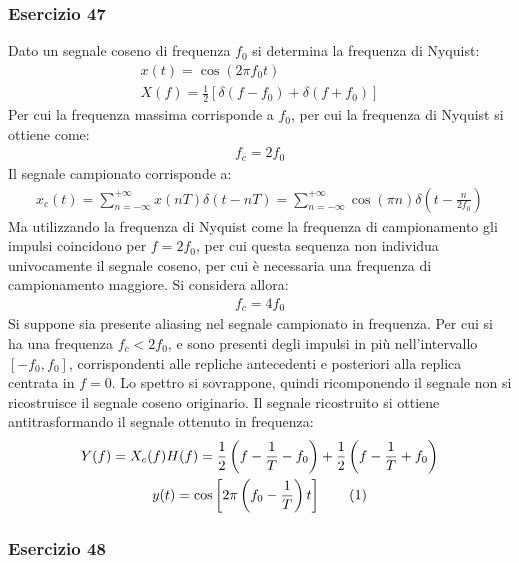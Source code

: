 \documentclass{article}
\newcommand{\tageq}{\tag{\stepcounter{equation}\theequation}}
\begin{document}
\subsubsection*{Esercizio 47}

Dato un segnale coseno di frequenza $f_0$ si determina la frequenza di Nyquist:
\begin{gather*}
    x(t)=\cos(2\pi f_0t)\\
    X(f)=\displaystyle\frac{1}{2}\left[\delta(f-f_0)+\delta(f+f_0)\right]
\end{gather*}
Per cui la frequenza massima corrisponde a $f_0$, per cui la frequenza di Nyquist si ottiene come:
\begin{gather}
    f_c=2f_0
\end{gather}
Il segnale campionato corrisponde a:
\begin{gather*}
    x_c(t)=\displaystyle\sum_{n=-\infty}^{+\infty}x(nT)\delta(t-nT)=\sum_{n=-\infty}^{+\infty}\cos(\pi n)\delta\left(t-\frac{n}{2f_0}\right)
\end{gather*}
Ma utilizzando la frequenza di Nyquist come la frequenza di campionamento gli impulsi coincidono per $f=2f_0$, per cui questa sequenza non individua univocamente il segnale 
coseno, per cui è necessaria una frequenza di campionamento maggiore. Si considera allora:
\begin{gather*}
    f_c=4f_0
\end{gather*}
Si suppone sia presente aliasing nel segnale campionato in frequenza. Per cui si ha una frequenza $f_c<2f_0$, e sono presenti degli impulsi in più nell'intervallo $[-f_0,f_0]$, 
corrispondenti alle repliche antecedenti e posteriori alla replica centrata in $f=0$. Lo spettro si sovrappone, quindi ricomponendo il segnale non si ricostruisce il 
segnale coseno originario. 
Il segnale ricostruito si ottiene antitrasformando il segnale ottenuto in frequenza:
\begin{gather*}
    Y(f)=X_c(f)H(f)=\displaystyle\frac{1}{2}\left(f-\frac{1}{T}-f_0\right)+\frac{1}{2}\left(f-\frac{1}{T}+f_0\right)\\
    y(t)=\cos\left[2\pi \left(f_0-\frac{1}{T}\right)t\right]\tageq
\end{gather*}

\subsubsection*{Esercizio 48}
\end{document}
